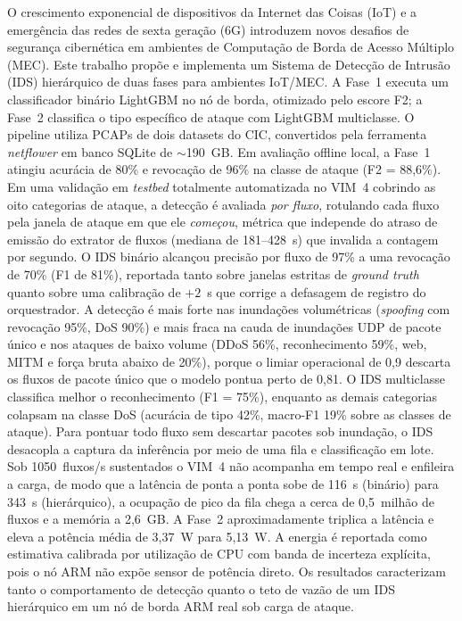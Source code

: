 \documentclass[12pt]{article}
\begin{document}
\begin{resumo}
O crescimento exponencial de dispositivos da Internet das Coisas (IoT) e a
emergência das redes de sexta geração (6G) introduzem novos desafios de
segurança cibernética em ambientes de Computação de Borda de Acesso Múltiplo (MEC).
Este trabalho propõe e implementa um Sistema de Detecção de Intrusão (IDS)
hierárquico de duas fases para ambientes IoT/MEC. A Fase~1 executa um
classificador binário LightGBM no nó de borda, otimizado pelo escore F2; a
Fase~2 classifica o tipo específico de ataque com LightGBM multiclasse. O pipeline utiliza PCAPs de
dois datasets do CIC, convertidos pela ferramenta \textit{netflower} em banco
SQLite de $\sim$190~GB. Em avaliação offline local, a Fase~1 atingiu acurácia de
80\% e revocação de 96\% na classe de ataque (F2 = 88,6\%). Em uma validação em
\textit{testbed} totalmente automatizada no VIM~4 cobrindo as oito categorias de
ataque, a detecção é avaliada \emph{por fluxo}, rotulando cada fluxo pela janela
de ataque em que ele \emph{começou}, métrica que independe do atraso de emissão
do extrator de fluxos (mediana de 181--428~s) que invalida a contagem por
segundo. O IDS binário alcançou precisão por fluxo de 97\% a uma revocação de
70\% (F1 de 81\%), reportada tanto sobre janelas estritas de \textit{ground
truth} quanto sobre uma calibração de $+2$~s que corrige a defasagem de registro
do orquestrador. A detecção é mais forte nas inundações volumétricas
(\textit{spoofing} com revocação 95\%, DoS 90\%) e mais fraca na cauda de
inundações UDP de pacote único e nos ataques de baixo volume (DDoS 56\%,
reconhecimento 59\%, web, MITM e força bruta abaixo de 20\%), porque o limiar
operacional de 0,9 descarta os fluxos de pacote único que o modelo pontua perto
de 0,81. O IDS multiclasse classifica melhor o reconhecimento (F1 = 75\%),
enquanto as demais categorias colapsam na classe DoS (acurácia de tipo 42\%,
macro-F1 19\% sobre as classes de ataque). Para pontuar todo fluxo sem descartar
pacotes sob inundação, o IDS desacopla a captura da inferência por meio de uma
fila e classificação em lote. Sob 1050~fluxos/s sustentados o VIM~4 não acompanha
em tempo real e enfileira a carga, de modo que a latência de ponta a ponta sobe
de 116~s (binário) para 343~s (hierárquico), a ocupação de pico da fila chega a
cerca de 0,5~milhão de fluxos e a memória a 2,6~GB. A Fase~2 aproximadamente
triplica a latência e eleva a potência média de 3,37~W para 5,13~W. A energia é
reportada como estimativa calibrada por utilização de CPU com banda de incerteza
explícita, pois o nó ARM não expõe sensor de potência direto. Os resultados
caracterizam tanto o comportamento de detecção quanto o teto de vazão de um IDS
hierárquico em um nó de borda ARM real sob carga de ataque.
\end{resumo}
\end{document}

